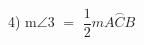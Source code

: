 \documentclass[preview]{standalone}
\begin{document}
\begin{center}
4) m$\angle{3}$ $=$ $\dfrac{1}{2}$$m\overset{\frown}{ACB}$
\end{center}
\end{document}
